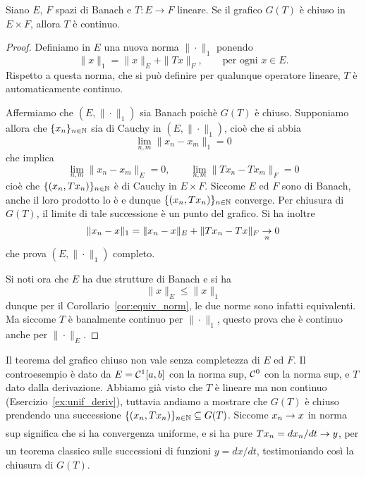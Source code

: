 \begin{theorem}
	Siano $E$, $F$ spazi di Banach e $T : E \to F$ lineare. Se il grafico $G(T)$ è chiuso in $E \times F$, allora $T$ è continuo.
\end{theorem}
\begin{proof}
	Definiamo in $E$ una nuova norma $\|\cdot\|_1$ ponendo
	\begin{equation*}
		\|x\|_1 = \|x\|_E + \|Tx\|_F, \qquad \text{per ogni $x \in E$}.
	\end{equation*}
	Rispetto a questa norma, che si può definire per qualunque operatore lineare, $T$ è automaticamente continuo.

	Affermiamo che $(E, \|\cdot\|_1)$ sia Banach poichè $G(T)$ è chiuso.
	Supponiamo allora che $\{x_n\}_{n \in \N}$ sia di Cauchy in $(E, \|\cdot\|_1)$, cioè che si abbia
	\begin{equation*}
		\lim_{n,m} \|x_n - x_m\|_1 = 0
	\end{equation*}
	che implica
	\begin{equation*}
		\lim_{n,m} \|x_n - x_m\|_E = 0, \qquad \lim_{n,m} \|Tx_n - Tx_m\|_F = 0
	\end{equation*}
	cioè che $\{(x_n, Tx_n)\}_{n \in \N}$ è di Cauchy in $E \times F$. Siccome $E$ ed $F$ sono di Banach, anche il loro prodotto lo è e dunque $\{(x_n, Tx_n)\}_{n \in \N}$ converge. Per chiusura di $G(T)$, il limite di tale successione è un punto del grafico. Si ha inoltre
	\begin{equation*}
		\|x_n - x\|_1 = \|x_n - x\|_E + \|Tx_n - Tx\|_F \conv[n] 0
	\end{equation*}
	che prova $(E, \|\cdot\|_1)$ completo.

	Si noti ora che $E$ ha due strutture di Banach e si ha
	\begin{equation*}
		\|x\|_E \leq \|x\|_1
	\end{equation*}
	dunque per il Corollario~\ref{cor:equiv_norm}, le due norme sono infatti equivalenti. Ma siccome $T$ è banalmente continuo per $\|\cdot\|_1$, questo prova che è continuo anche per $\|\cdot\|_E$.
\end{proof}

\begin{remark}
	Il teorema del grafico chiuso non vale senza completezza di $E$ ed $F$.
	Il controesempio è dato da $E = \Cone[a,b]$ con la norma sup, $\Czero$ con la norma sup, e $T$ dato dalla derivazione. Abbiamo già visto che $T$ è lineare ma non continuo (Esercizio~\ref{ex:unif_deriv}), tuttavia andiamo a mostrare che $G(T)$ è chiuso prendendo una successione $\{(x_n, Tx_n)\}_{n \in \N} \subseteq G(T)$. Siccome $x_n \conv x$ in norma sup significa che si ha convergenza uniforme, e si ha pure $Tx_n = dx_n/dt \conv y$, per un teorema classico sulle successioni di funzioni $y = dx/dt$, testimoniando così la chiusura di $G(T)$.
\end{remark}

